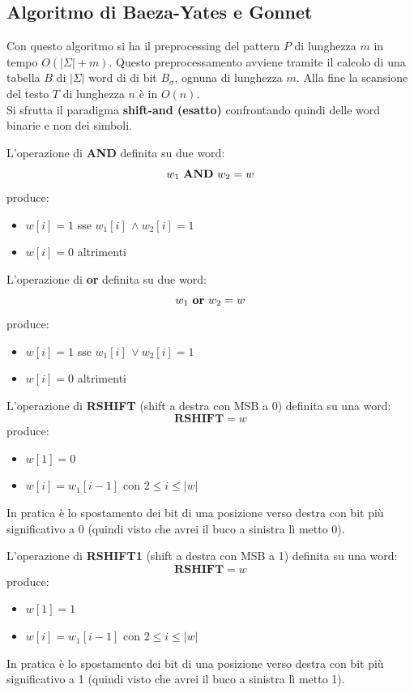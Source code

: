 \documentclass[a4paper,12pt, oneside]{book}
\begin{document}
\subsection{Algoritmo di Baeza-Yates e Gonnet}
Con questo algoritmo si ha il preprocessing del pattern $P$ di lunghezza $m$ in
tempo $O(|\Sigma|+m)$. Questo preprocessamento avviene tramite il calcolo di una
tabella $B$ di $|\Sigma|$ word di di bit $B_\sigma$, ognuna di lunghezza
$m$. Alla fine la scansione del testo $T$ di lunghezza $n$ è in $O(n)$.\\
Si sfrutta il paradigma \textbf{shift-and (esatto)} confrontando quindi delle
word binarie e non dei simboli.
\begin{definizione}
  L'operazione di \textbf{AND} definita su due word:
  \[w_1\mbox{ \textbf{AND} }w_2=w\]
  produce:
  \begin{itemize}
    \item $w[i]=1$ sse $w_1[i]\,\land w_2[i]=1$
    \item $w[i]=0$ altrimenti
  \end{itemize}
\end{definizione}
\begin{definizione}
  L'operazione di \textbf{or} definita su due word:
  \[w_1\mbox{ \textbf{or} }w_2=w\]
  produce:
  \begin{itemize}
    \item $w[i]=1$ sse $w_1[i]\,\lor w_2[i]=1$
    \item $w[i]=0$ altrimenti
  \end{itemize}
\end{definizione}
\begin{definizione}
  L'operazione di \textbf{RSHIFT} (shift a destra con MSB a 0) definita su una
  word: 
  \[\mathbf{RSHIFT}=w\]
  produce:
  \begin{itemize}
    \item $w[1]=0$
    \item $w[i]=w_1[i-1]$ con $2\leq i\leq |w|$
  \end{itemize}
  In pratica è lo spostamento dei bit di una posizione verso destra con bit più
  significativo a 0 (quindi visto che avrei il buco a sinistra lì metto 0).
\end{definizione}
\begin{definizione}
  L'operazione di \textbf{RSHIFT1} (shift a destra con MSB a 1) definita su una word:
  \[\mathbf{RSHIFT}=w\]
  produce:
  \begin{itemize}
    \item $w[1]=1$
    \item $w[i]=w_1[i-1]$ con $2\leq i\leq |w|$
  \end{itemize}
  In pratica è lo spostamento dei bit di una posizione verso destra con bit più
  significativo a 1 (quindi visto che avrei il buco a sinistra lì metto 1).
\end{definizione}
\end{document}
